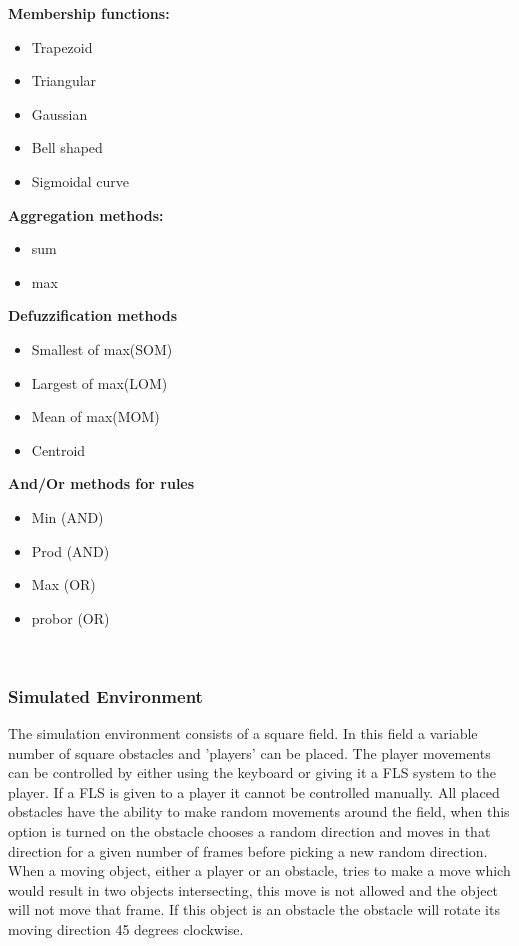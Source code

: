 \documentclass[conference]{IEEEtran}
\begin{document}
\textbf{Membership functions:}
\begin{itemize}
  \item Trapezoid
  \item Triangular
  \item Gaussian
  \item Bell shaped
  \item Sigmoidal curve
\end{itemize}

\textbf{Aggregation methods:}
\begin{itemize}
  \item sum
  \item max
\end{itemize}

\textbf{Defuzzification methods}
\begin{itemize}
  \item Smallest of max(SOM)
  \item Largest of max(LOM)
  \item Mean of max(MOM)
  \item Centroid
\end{itemize}

\textbf{And/Or methods for rules}
\begin{itemize}
  \item Min (AND)
  \item Prod (AND)
  \item Max (OR)
  \item probor (OR)
\end{itemize}

\hfill\\
\subsubsection*{Simulated Environment}
The simulation environment consists of a square field. In this field a variable number of square obstacles and 'players' can be placed. The player movements can be controlled by either using the keyboard or giving it a FLS system to the player. If a FLS is given to a player it cannot be controlled manually.
All placed obstacles have the ability to make random movements around the field, when this option is turned on the obstacle chooses a random direction and moves in that direction for a given number of frames before picking a new random direction.\\

When a moving object, either a player or an obstacle, tries to make a move which would result in two objects intersecting, this move is not allowed and the object will not move that frame. If this object is an obstacle the obstacle will rotate its moving direction 45 degrees clockwise.\\
\end{document}
